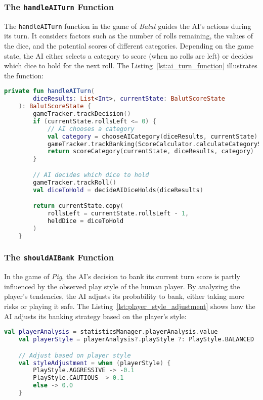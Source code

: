 \subsubsection{The \texttt{handleAITurn} Function}

The \texttt{handleAITurn} function in the game of \emph{Balut} guides the AI's actions during its turn. It considers factors such as the number of rolls remaining, the values of the dice, and the potential scores of different categories. Depending on the game state, the AI either selects a category to score (when no rolls are left) or decides which dice to hold for the next roll. The Listing~\ref{lst:ai_turn_function}  illustrates the function:

\begin{lstlisting}[language=Kotlin, caption={handleAITurn Function}, label=lst:ai_turn_function]
    private fun handleAITurn(
        diceResults: List<Int>, currentState: BalutScoreState
    ): BalutScoreState {
        gameTracker.trackDecision()
        if (currentState.rollsLeft <= 0) {
            // AI chooses a category
            val category = chooseAICategory(diceResults, currentState)
            gameTracker.trackBanking(ScoreCalculator.calculateCategoryScore(diceResults, category))
            return scoreCategory(currentState, diceResults, category)
        }

        // AI decides which dice to hold
        gameTracker.trackRoll()
        val diceToHold = decideAIDiceHolds(diceResults)

        return currentState.copy(
            rollsLeft = currentState.rollsLeft - 1,
            heldDice = diceToHold
        )
    }
\end{lstlisting}

\subsubsection{The \texttt{shouldAIBank} Function}

In the game of \emph{Pig}, the AI's decision to bank its current turn score is partly influenced by the observed play style of the human player. By analyzing the player's tendencies, the AI adjusts its probability to bank, either taking more risks or playing it safe. The Listing~\ref{lst:player_style_adjustment} shows how the AI adjusts its banking strategy based on the player's style:

\begin{lstlisting}[language=Kotlin, caption={Player Style Adjustment}, label=lst:player_style_adjustment]
    val playerAnalysis = statisticsManager.playerAnalysis.value
    val playerStyle = playerAnalysis?.playStyle ?: PlayStyle.BALANCED

    // Adjust based on player style
    val styleAdjustment = when (playerStyle) {
        PlayStyle.AGGRESSIVE -> -0.1
        PlayStyle.CAUTIOUS -> 0.1
        else -> 0.0
    }
\end{lstlisting}

